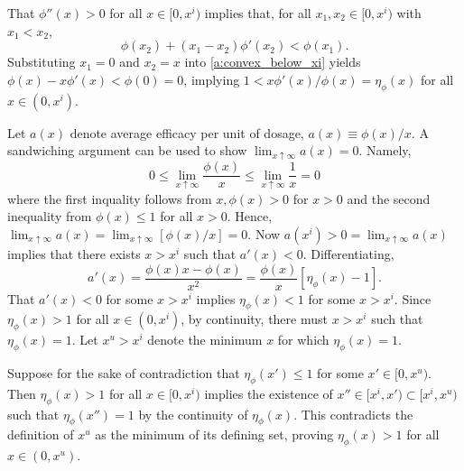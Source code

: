\documentclass[12pt]{article}
\newcommand{\efficacy}{\phi}
\newcommand{\elasticity}[1]{\eta_{#1}}
\begin{document}
That $\efficacy''(x) > 0$ for all $x \in [0, x^i)$ implies that, for all $x_1, x_2 \in [0, x^i)$ with $x_1 < x_2$, 
\begin{equation}
\label{a:convex_below_xi}
\efficacy(x_2) + (x_1 - x_2) \efficacy'(x_2) < \efficacy(x_1).
\end{equation}
Substituting $x_1 = 0$ and $x_2 = x$ into \eqref{a:convex_below_xi} yields $\efficacy(x) - x \efficacy'(x) < \efficacy(0) = 0$, implying $1 < x \efficacy'(x) / \efficacy(x) = \elasticity{\efficacy}(x)$ for all $x \in (0,x^i)$.  

Let $a(x)$ denote average efficacy per unit of dosage, $a(x) \equiv \efficacy(x) / x$. A sandwiching argument can be used to show $\lim_{x \uparrow \infty} a(x) = 0$. Namely, 
\begin{equation}
\label{a:sandwich}
0 \leq \lim_{x \uparrow \infty} \frac{\efficacy(x)}{x} \leq \lim_{x \uparrow \infty} \frac{1}{x} = 0
\end{equation}
where the first inquality follows from $x, \efficacy(x) > 0$ for $x > 0$ and the second inequality from $\efficacy(x) \leq 1$ for all $x > 0$. Hence, $\lim_{x \uparrow \infty} a(x) = \lim_{x \uparrow \infty} [\efficacy(x)/x] = 0$. Now $a(x^i) > 0 = \lim_{x \uparrow \infty} a(x)$ implies that there exists $x > x^i$ such that $a'(x) < 0$. Differentiating,
\begin{equation}
\label{a:diff_a}
a'(x) = \frac{\efficacy(x)x - \efficacy(x)}{x^2} = \frac{\efficacy(x)}{x} [\elasticity{\efficacy}(x) - 1].
\end{equation}
That $a'(x) < 0$ for some $x > x^i$ implies $\elasticity{\efficacy}(x) < 1$ for some $x > x^i$. Since $\elasticity{\efficacy}(x) > 1$ for all $x \in (0,x^i)$, by continuity, there must $x > x^i$ such that $\elasticity{\efficacy}(x) = 1$. Let $x^u > x^i$ denote the minimum $x$ for which $\elasticity{\efficacy}(x) = 1$.

Suppose for the sake of contradiction that $\elasticity{\efficacy}(x') \leq 1$ for some $x' \in [0, x^u)$. Then $\elasticity{\efficacy}(x) > 1$ for all $x \in [0, x^i)$ implies the existence of $x'' \in [x^i, x') \subset [x^i, x^u)$ such that $\elasticity{\efficacy}(x'') = 1$ by the continuity of $\elasticity{\efficacy}(x)$. This contradicts the definition of $x^u$ as the minimum of its defining set, proving $\elasticity{\efficacy}(x) > 1$ for all $x \in (0, x^u)$.
\end{document}
